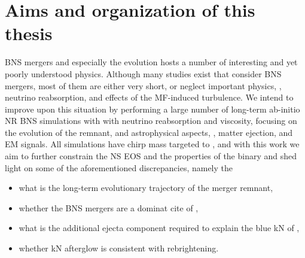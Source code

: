 



\section{Aims and organization of this thesis}

\ac{BNS} mergers and especially the \pmerg{} evolution hosts a number of interesting 
and yet poorly understood physics. Although many studies exist that consider \ac{BNS} mergers, 
most of them are either very short, or neglect important physics, \eg, neutrino reabsorption, 
and effects of the \ac{MF}-induced turbulence. 
%
We intend to improve upon this situation by performing a large number of long-term ab-initio 
\ac{NR} \ac{BNS} simulations with with neutrino reabsorption and viscosity, focusing on the 
\pmerg{} evolution of the remnant, and astrophysical aspects, \ie, matter ejection, 
\rproc{} \nuc{} and \ac{EM} signals. 
%
All simulations have chirp mass targeted to \GW{}, and with this work we aim to further 
constrain the \ac{NS} \ac{EOS} and the properties of the binary and shed light on 
some of the aforementioned discrepancies, namely the 
\begin{itemize}
    \item what is the long-term evolutionary trajectory of the merger remnant,
    \item whether the \ac{BNS} mergers are a dominat cite of \rproc{}, 
    \item what is the additional ejecta component required to explain the blue \ac{kN} of \AT{}, 
    \item whether \ac{kN} afterglow is consistent with \GRB{} rebrightening.
\end{itemize}

